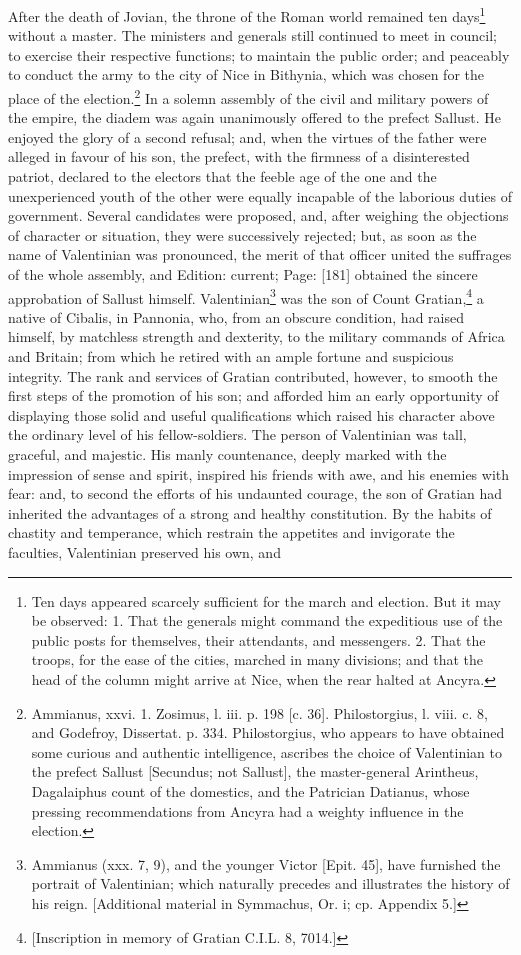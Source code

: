 After the death of Jovian, the throne of the Roman world remained ten days\footnote{Ten days appeared scarcely sufficient for the march and election. But it may be observed: 1. That the generals might command the expeditious use of the public posts for themselves, their attendants, and messengers. 2. That the troops, for the ease of the cities, marched in many divisions; and that the head of the column might arrive at Nice, when the rear halted at Ancyra.} without a master. The ministers and generals still continued to meet in council; to exercise their respective functions; to maintain the public order; and peaceably to conduct the army to the city of Nice in Bithynia, which was chosen for the place of the election.\footnote{Ammianus, xxvi. 1. Zosimus, l. iii. p. 198 [c. 36]. Philostorgius, l. viii. c. 8, and Godefroy, Dissertat. p. 334. Philostorgius, who appears to have obtained some curious and authentic intelligence, ascribes the choice of Valentinian to the prefect Sallust [Secundus; not Sallust], the master-general Arintheus, Dagalaiphus count of the domestics, and the Patrician Datianus, whose pressing recommendations from Ancyra had a weighty influence in the election.} In a solemn assembly of the civil and military powers of the empire, the diadem was again unanimously offered to the prefect Sallust. He enjoyed the glory of a second refusal; and, when the virtues of the father were alleged in favour of his son, the prefect, with the firmness of a disinterested patriot, declared to the electors that the feeble age of the one and the unexperienced youth of the other were equally incapable of the laborious duties of government. Several candidates were proposed, and, after weighing the objections of character or situation, they were successively rejected; but, as soon as the name of Valentinian was pronounced, the merit of that officer united the suffrages of the whole assembly, and Edition: current; Page: [181] obtained the sincere approbation of Sallust himself. Valentinian\footnote{Ammianus (xxx. 7, 9), and the younger Victor [Epit. 45], have furnished the portrait of Valentinian; which naturally precedes and illustrates the history of his reign. [Additional material in Symmachus, Or. i; cp. Appendix 5.]} was the son of Count Gratian,\footnote{[Inscription in memory of Gratian C.I.L. 8, 7014.]} a native of Cibalis, in Pannonia, who, from an obscure condition, had raised himself, by matchless strength and dexterity, to the military commands of Africa and Britain; from which he retired with an ample fortune and suspicious integrity. The rank and services of Gratian contributed, however, to smooth the first steps of the promotion of his son; and afforded him an early opportunity of displaying those solid and useful qualifications which raised his character above the ordinary level of his fellow-soldiers. The person of Valentinian was tall, graceful, and majestic. His manly countenance, deeply marked with the impression of sense and spirit, inspired his friends with awe, and his enemies with fear: and, to second the efforts of his undaunted courage, the son of Gratian had inherited the advantages of a strong and healthy constitution. By the habits of chastity and temperance, which restrain the appetites and invigorate the faculties, Valentinian preserved his own, and 